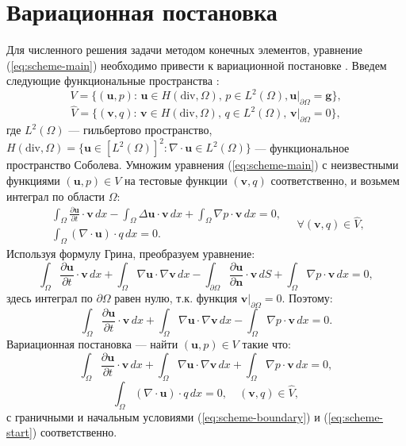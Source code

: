 \documentclass[12pt]{article}
\begin{document}
\section{Вариационная постановка}
Для численного решения задачи методом конечных элементов, уравнение (\ref{eq:scheme-main}) необходимо привести к вариационной постановке \cite{fenicsbook-2012}. Введем следующие функциональные пространства \cite{guzman-2011}:
$$
V=\{ ({\bm u}, p) : \, {\bm u} \in H(\mathrm{div}, \Omega), \, p \in L^2(\Omega),  {\bm u}|_{\partial \Omega}= {\bm g} \},
$$
$$
\hat V=\{ ({\bm v}, q) : \, {\bm v} \in H(\mathrm{div}, \Omega), \, q \in L^2(\Omega), \, {\bm v}|_{\partial \Omega}=0 \},
$$
где $L^2(\Omega)$ --- гильбертово пространство, $H(\mathrm{div}, \Omega) = \{{\bm u} \in [L^2(\Omega)]^2 : \nabla\cdot {\bm u} \in L^2(\Omega)\}$ --- функциональное пространство Соболева.
Умножим уравнения (\ref{eq:scheme-main}) с неизвестными функциями $({\bm u}, p) \in V$  на тестовые функции $({\bm v}, q)$ соответственно, и возьмем интеграл по области $\Omega$:
$$
\begin{aligned}
\int_{\Omega} \frac{\partial {\bm u}}{\partial t} \cdot {\bm v} \,dx - \int_{\Omega} \Delta {\bm u} \cdot {\bm v} \,dx + \int_{\Omega} \nabla p \cdot {\bm v} \,dx = 0, \\
\int_{\Omega} (\nabla \cdot {\bm u}) \cdot q \,dx = 0.
\end{aligned}
\quad \forall ({\bm v},q) \in \hat V,
$$
Используя формулу Грина, преобразуем уравнение:
$$
\int_{\Omega} \frac{\partial {\bm u}}{\partial t} \cdot {\bm v} \,dx + \int_{\Omega} \nabla {\bm u} \cdot \nabla {\bm v} \,dx - \int_{\partial \Omega} \frac{\partial {\bm u}}{\partial {\bm n}} \cdot {\bm v} \,dS + \int_{\Omega} \nabla p \cdot {\bm v} \,dx = 0,
$$
здесь интеграл по $\partial \Omega$ равен нулю, т.к. функция ${\bm v} | _ {\partial \Omega} = 0$. Поэтому:
$$
\int_{\Omega} \frac{\partial {\bm u}}{\partial t} \cdot {\bm v} \,dx + \int_{\Omega} \nabla {\bm u} \cdot \nabla {\bm v} \,dx - \int_{\Omega} \nabla p \cdot {\bm v} \,dx = 0.
$$
Вариационная постановка --- найти $({\bm u}, p) \in V$ такие что:
$$
\int_{\Omega} \frac{\partial {\bm u}}{\partial t} \cdot {\bm v} \,dx + \int_{\Omega} \nabla {\bm u} \cdot \nabla {\bm v} \,dx + \int_{\Omega} \nabla p \cdot {\bm v} \,dx = 0, 
$$
$$
\int_{\Omega} (\nabla \cdot {\bm u}) \cdot q \,dx = 0, \quad ({\bm v}, q) \in \hat V,
$$
с граничными и начальным условиями (\ref{eq:scheme-boundary}) и (\ref{eq:scheme-start}) соответственно.
\end{document}
